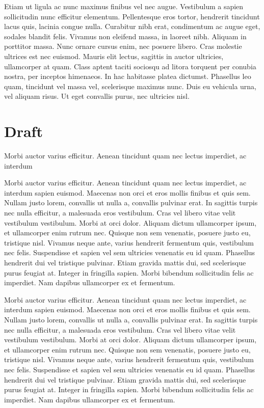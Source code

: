\documentclass[12pt,a4paper]{book}
\begin{document}
 Etiam ut ligula ac nunc maximus finibus vel nec augue. Vestibulum a sapien sollicitudin nunc efficitur elementum. Pellentesque eros tortor, hendrerit tincidunt lacus quis, lacinia congue nulla. Curabitur nibh erat, condimentum ac augue eget, sodales blandit felis. Vivamus non eleifend massa, in laoreet nibh. Aliquam in porttitor massa. Nunc ornare cursus enim, nec posuere libero. Cras molestie ultrices est nec euismod. Mauris elit lectus, sagittis in auctor ultricies, ullamcorper at quam. Class aptent taciti sociosqu ad litora torquent per conubia nostra, per inceptos himenaeos. In hac habitasse platea dictumst. Phasellus leo quam, tincidunt vel massa vel, scelerisque maximus nunc. Duis eu vehicula urna, vel aliquam risus. Ut eget convallis purus, nec ultricies nisl.

\section{Draft}

\begin{cwdraft}
    Morbi auctor varius efficitur. Aenean tincidunt quam nec lectus imperdiet, ac interdum
\end{cwdraft}

\begin{cwdraft}
Morbi auctor varius efficitur. Aenean tincidunt quam nec lectus imperdiet, ac interdum sapien euismod. Maecenas non orci et eros mollis finibus et quis sem. Nullam justo lorem, convallis ut nulla a, convallis pulvinar erat. In sagittis turpis nec nulla efficitur, a malesuada eros vestibulum. Cras vel libero vitae velit vestibulum vestibulum. Morbi at orci dolor. Aliquam dictum ullamcorper ipsum, et ullamcorper enim rutrum nec. Quisque non sem venenatis, posuere justo eu, tristique nisl. Vivamus neque ante, varius hendrerit fermentum quis, vestibulum nec felis. Suspendisse et sapien vel sem ultricies venenatis eu id quam. Phasellus hendrerit dui vel tristique pulvinar. Etiam gravida mattis dui, sed scelerisque purus feugiat at. Integer in fringilla sapien. Morbi bibendum sollicitudin felis ac imperdiet. Nam dapibus ullamcorper ex et fermentum.
\end{cwdraft}

\begin{cwdraft}[A draft]
    Morbi auctor varius efficitur. Aenean tincidunt quam nec lectus imperdiet, ac interdum sapien euismod. Maecenas non orci et eros mollis finibus et quis sem. Nullam justo lorem, convallis ut nulla a, convallis pulvinar erat. In sagittis turpis nec nulla efficitur, a malesuada eros vestibulum. Cras vel libero vitae velit vestibulum vestibulum. Morbi at orci dolor. Aliquam dictum ullamcorper ipsum, et ullamcorper enim rutrum nec. Quisque non sem venenatis, posuere justo eu, tristique nisl. Vivamus neque ante, varius hendrerit fermentum quis, vestibulum nec felis. Suspendisse et sapien vel sem ultricies venenatis eu id quam. Phasellus hendrerit dui vel tristique pulvinar. Etiam gravida mattis dui, sed scelerisque purus feugiat at. Integer in fringilla sapien. Morbi bibendum sollicitudin felis ac imperdiet. Nam dapibus ullamcorper ex et fermentum.
\end{cwdraft}
\end{document}
